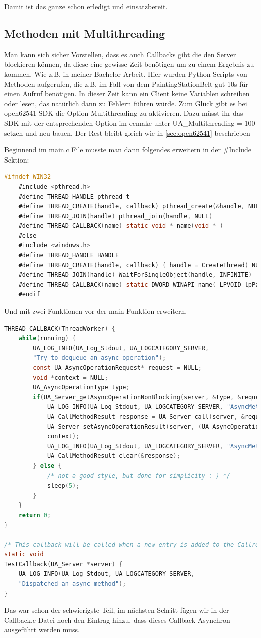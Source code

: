 Damit ist das ganze schon erledigt und einsatzbereit.
\subsection{Methoden mit Multithreading}
Man kann sich sicher Vorstellen, dass es auch Callbacks gibt die den Server blockieren können, da diese eine gewisse Zeit benötigen um zu einem Ergebnis zu kommen.
Wie z.B. in meiner Bachelor Arbeit. Hier wurden Python Scripts von Methoden aufgerufen, die z.B. im Fall von dem PaintingStationBelt gut 10s für einen Aufruf benötigen. In dieser Zeit kann ein Client keine Variablen schreiben oder lesen, das natürlich dann zu Fehlern führen würde. Zum Glück gibt es bei open62541 SDK die Option Multithreading zu aktivieren. Dazu müsst ihr das SDK mit der entsprechenden Option im ccmake unter UA\_Multithreading = 100 setzen und neu bauen.  Der Rest bleibt gleich wie in \autoref{sec:open62541} beschrieben

Beginnend im main.c File musste man dann folgendes erweitern in der \#Include Sektion:
\begin{lstlisting}[language=C]
	#ifndef WIN32
	#include <pthread.h>
	#define THREAD_HANDLE pthread_t
	#define THREAD_CREATE(handle, callback) pthread_create(&handle, NULL, callback, NULL)
	#define THREAD_JOIN(handle) pthread_join(handle, NULL)
	#define THREAD_CALLBACK(name) static void * name(void *_)
	#else
	#include <windows.h>
	#define THREAD_HANDLE HANDLE
	#define THREAD_CREATE(handle, callback) { handle = CreateThread( NULL, 0, callback, NULL, 0, NULL); }
	#define THREAD_JOIN(handle) WaitForSingleObject(handle, INFINITE)
	#define THREAD_CALLBACK(name) static DWORD WINAPI name( LPVOID lpParam )
	#endif
\end{lstlisting}
Und mit zwei Funktionen vor der main Funktion erweitern.

\begin{lstlisting}[language=C]
THREAD_CALLBACK(ThreadWorker) {
	while(running) {
		UA_LOG_INFO(UA_Log_Stdout, UA_LOGCATEGORY_SERVER,
		"Try to dequeue an async operation");
		const UA_AsyncOperationRequest* request = NULL;
		void *context = NULL;
		UA_AsyncOperationType type;
		if(UA_Server_getAsyncOperationNonBlocking(server, &type, &request, &context, NULL) == true) {
			UA_LOG_INFO(UA_Log_Stdout, UA_LOGCATEGORY_SERVER, "AsyncMethod_Testing: Got entry: OKAY");
			UA_CallMethodResult response = UA_Server_call(server, &request->callMethodRequest);
			UA_Server_setAsyncOperationResult(server, (UA_AsyncOperationResponse*)&response,
			context);
			UA_LOG_INFO(UA_Log_Stdout, UA_LOGCATEGORY_SERVER, "AsyncMethod_Testing: Call done: OKAY");
			UA_CallMethodResult_clear(&response);
		} else {
			/* not a good style, but done for simplicity :-) */
			sleep(5);
		}
	}
	return 0;
}

/* This callback will be called when a new entry is added to the Callrequest queue */
static void
TestCallback(UA_Server *server) {
	UA_LOG_INFO(UA_Log_Stdout, UA_LOGCATEGORY_SERVER,
	"Dispatched an async method");
}
\end{lstlisting}
Das war schon der schwierigste Teil, im nächsten Schritt fügen wir in der Callback.c Datei noch den Eintrag hinzu, dass dieses Callback Asynchron ausgeführt werden muss.

